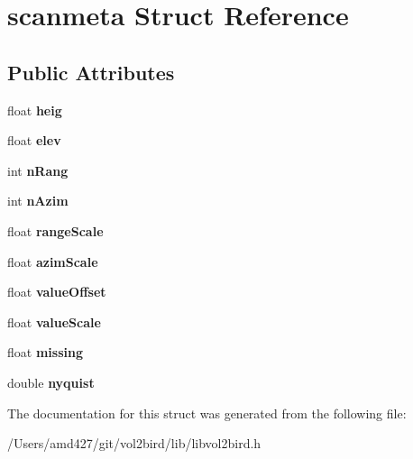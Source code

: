 \hypertarget{structscanmeta}{}\section{scanmeta Struct Reference}
\label{structscanmeta}
\subsection*{Public Attributes}
\begin{DoxyCompactItemize}
\item 
\mbox{\label{structscanmeta_a380d83dd660e5266c457bd047fc38dff}} 
float {\bfseries heig}
\item 
\mbox{\label{structscanmeta_a4e4dd3358ace4d78ef40e0737fa4aeb4}} 
float {\bfseries elev}
\item 
\mbox{\label{structscanmeta_a4445aaf53be92252e51824102f3a1c9f}} 
int {\bfseries n\+Rang}
\item 
\mbox{\label{structscanmeta_abb1dc2297c4d92d9f261fd3edc67fadc}} 
int {\bfseries n\+Azim}
\item 
\mbox{\label{structscanmeta_afd6838e7cfdbaa55702c69f2f892aecf}} 
float {\bfseries range\+Scale}
\item 
\mbox{\label{structscanmeta_a50ebfcf3cfdf9dd7f9072af81fb72244}} 
float {\bfseries azim\+Scale}
\item 
\mbox{\label{structscanmeta_ab6619834d96335a77d674ea98c4108a5}} 
float {\bfseries value\+Offset}
\item 
\mbox{\label{structscanmeta_af61dbec70f69d7e833f861abcaaaee28}} 
float {\bfseries value\+Scale}
\item 
\mbox{\label{structscanmeta_a3491ceb7dcfb1ef885b12fd95eb14248}} 
float {\bfseries missing}
\item 
\mbox{\label{structscanmeta_a9cdbf260baf6e01dce9fc8be3b8253d9}} 
double {\bfseries nyquist}
\end{DoxyCompactItemize}


The documentation for this struct was generated from the following file\+:\begin{DoxyCompactItemize}
\item 
/\+Users/amd427/git/vol2bird/lib/libvol2bird.\+h\end{DoxyCompactItemize}
